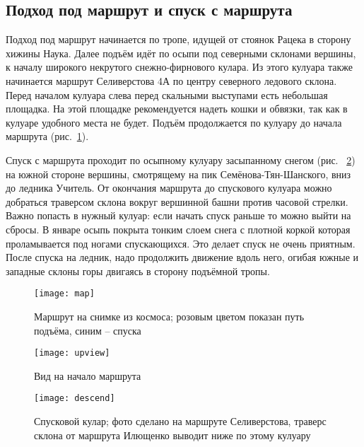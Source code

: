 \documentclass[fleqn, 10pt]{extarticle}
\begin{document}
\subsection{Подход под маршрут и спуск с маршрута}
	Подход под маршрут начинается по тропе, идущей от стоянок Рацека в сторону хижины Наука. Далее подъём идёт по осыпи под северными склонами вершины, к началу широкого некрутого
	снежно-фирнового кулара. Из этого кулуара также начинается маршрут Селиверстова 4А по центру северного ледового склона. Перед началом кулуара слева перед скальными выступами есть небольшая площадка.
	На этой площадке рекомендуется надеть кошки и обвязки, так как в кулуаре удобного места не будет. Подъём продолжается по кулуару до начала маршрута (рис.~\ref{start}).

	Спуск с маршрута проходит по осыпному кулуару засыпанному снегом (рис. ~\ref{descend}) на южной стороне вершины, смотрящему на пик Семёнова-Тян-Шанского, вниз до ледника Учитель.
	От окончания маршрута до спускового кулуара можно
	добраться траверсом склона вокруг вершинной башни против часовой стрелки. Важно попасть в нужный кулуар: если начать спуск раньше то можно выйти на сбросы. В январе осыпь покрыта тонким слоем
	снега с плотной коркой которая проламывается под ногами спускающихся. Это делает спуск не очень приятным. После спуска на ледник, надо продолжить движение вдоль него, огибая южные и западные
	склоны горы двигаясь в сторону подъёмной тропы.
	\begin{figure}[ht]
		\centering
		\texttt{[image: map]}
		\caption{Маршрут на снимке из космоса; розовым цветом показан путь подъёма, синим -- спуска}
	\end{figure}
	\begin{figure}[ht]
		\centering
		\texttt{[image: upview]}
		\caption{Вид на начало маршрута}\label{start}
	\end{figure}\begin{figure}[ht]
		\centering
		\texttt{[image: descend]}
		\caption{Спусковой кулар; фото сделано на маршруте Селиверстова, траверс склона от маршрута Илющенко выводит ниже по этому кулуару}\label{descend}
	\end{figure}
\FloatBarrier
\end{document}
